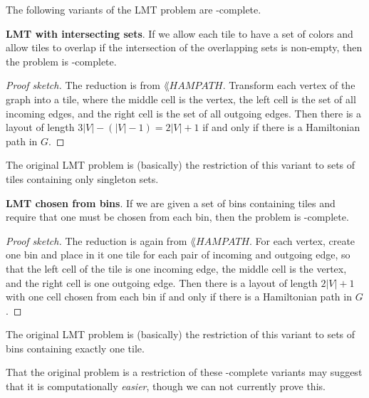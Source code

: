 The following variants of the LMT problem are \NP-complete.

{\bf LMT with intersecting sets}. If we allow each tile
to have a set of colors and allow tiles to overlap if the intersection of the
overlapping sets is non-empty, then the problem is \NP-complete.

\begin{shaded}
\begin{proof}[Proof sketch]
  The reduction is from $\lang{HAMPATH}$. Transform each vertex of the graph
  into a tile, where the middle cell is the vertex, the left cell is the set of
  all incoming edges, and the right cell is the set of all outgoing edges. Then
  there is a layout of length $3|V| - (|V| - 1) = 2|V| + 1$ if and only if
  there is a Hamiltonian path in $G$.
\end{proof}
\end{shaded}

The original LMT problem is (basically) the restriction of this variant to sets
of tiles containing only singleton sets.

{\bf LMT chosen from bins}. If we are given a set of bins
containing tiles and require that one must be chosen from each bin, then the
problem is \NP-complete.

\begin{shaded}
\begin{proof}[Proof sketch]
  The reduction is again from $\lang{HAMPATH}$. For each vertex, create one bin
  and place in it one tile for each pair of incoming and outgoing edge, so that
  the left cell of the tile is one incoming edge, the middle cell is the
  vertex, and the right cell is one outgoing edge. Then there is a layout of
  length $2|V| + 1$ with one cell chosen from each bin if and only if there is
  a Hamiltonian path in $G$.
\end{proof}
\end{shaded}

The original LMT problem is (basically) the restriction of this variant to sets
of bins containing exactly one tile.

That the original problem is a restriction of these \NP-complete variants may
suggest that it is computationally \emph{easier}, though we can not currently
prove this.
